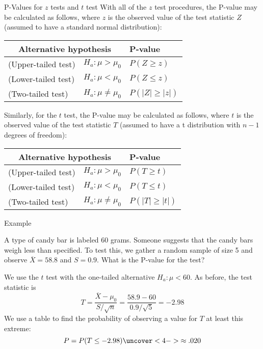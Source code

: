 \documentclass{beamer}
\begin{document}
\begin{frame}{P-Values for $z$ tests and $t$ test}
With all of the $z$ test procedures, the P-value may be calculated as follows, where $z$ is the observed value of the test statistic $Z$ (assumed to have a standard normal distribution):
\begin{center}
\begin{tabular}{ll|l}
\multicolumn{2}{c}{Alternative hypothesis} & P-value \\ \hline
(Upper-tailed test) & $H_a: \mu>\mu_0$ & $P(Z\geq z)$ \\
(Lower-tailed test) & $H_a: \mu<\mu_0$ & $P(Z\leq z)$ \\
(Two-tailed test) & $H_a: \mu\neq\mu_0$ & $P(|Z|\geq |z|)$\\
\end{tabular}
\end{center}

Similarly, for the $t$ test, the P-value may be calculated as follows, where $t$ is the observed value of the test statistic $T$ (assumed to have a t distribution with $n-1$ degrees of freedom):
\begin{center}
\begin{tabular}{ll|l}
\multicolumn{2}{c}{Alternative hypothesis} & P-value \\ \hline
(Upper-tailed test) & $H_a: \mu>\mu_0$ & $P(T\geq t)$ \\
(Lower-tailed test) & $H_a: \mu<\mu_0$ & $P(T\leq t)$ \\
(Two-tailed test) & $H_a: \mu\neq\mu_0$ & $P(|T|\geq |t|)$\\
\end{tabular}
\end{center}

\end{frame}

\begin{frame}{Example}
\begin{block}{}
A type of candy bar is labeled 60 grams. Someone suggests that the candy bars weigh less than specified. To test this, we gather a random sample of size 5 and observe $\overline X=58.8$ and $S=0.9$. What is the P-value for the test?
\end{block}

\pause We use the $t$ test with the one-tailed alternative $H_a: \mu<60$. As before, the test statistic  is
$$T=\frac{\overline X-\mu_0}{S/\sqrt{n}}=\frac{58.9-60}{0.9/\sqrt{5}}=-2.98$$
\pause We use a table to find the probability of observing a value for $T$ at least this extreme:
$$P=P(T\leq -2.98)
\uncover<4->{ \approx .020 }$$
\end{frame}
\end{document}
